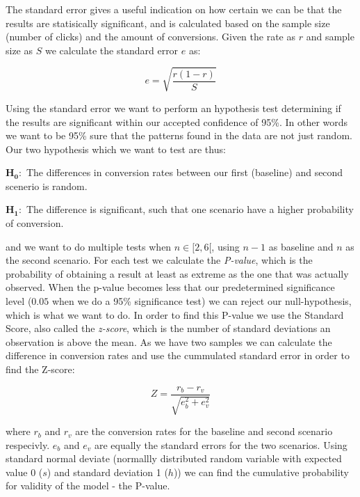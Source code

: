 The standard error gives a useful indication on how certain we can be that the
results are statisically significant, and is calculated based on the sample
size (number of clicks) and the amount of conversions. Given the rate as $r$
and sample size as $S$ we calculate the standard error $e$ as:

\begin{equation}
  e = \sqrt{\frac{r(1 - r)}{S}}
\end{equation}

Using the standard error we want to perform an hypothesis test determining if
the results are significant within our accepted confidence of 95\%. In other
words we want to be 95\% sure that the patterns found in the data are not just
random. Our two hypothesis which we want to test are thus:

$\mathbf{H_0:}$ The differences in conversion rates between our first
(baseline) and second scenerio is random.

$\mathbf{H_1:}$ The difference is significant, such that one scenario have a
higher probability of conversion.

and we want to do multiple tests when $n \in [2,6[$, using $n-1$ as baseline
and $n$ as the second scenario. For each test we calculate the
\textit{P-value}, which is the probability of obtaining a result at least as
extreme as the one that was actually observed. When the p-value becomes less
that our predetermined significance level ($0.05$ when we do a 95\%
significance test) we can reject our null-hypothesis, which is what we want to
do. In order to find this P-value we use the Standard Score, also called the
\textit{z-score}, which is the number of standard deviations an observation is
above the mean. As we have two samples we can calculate the difference in
conversion rates and use the cummulated standard error in order to find the
Z-score:

\begin{equation}
  \label{eq-z-score}
  Z = \frac{r_b - r_v}{\sqrt{e_{b}^{2} + e_{v}^{2}}}
\end{equation}

where $r_b$ and $r_v$ are the conversion rates for the baseline and second
scenario respecivly. $e_b$ and $e_v$ are equally the standard errors for the
two scenarios. Using standard normal deviate (normallly distributed random
variable with expected value 0 ($s$) and standard deviation 1 ($h$)) we can
find the cumulative probability for validity of the model - the P-value.

